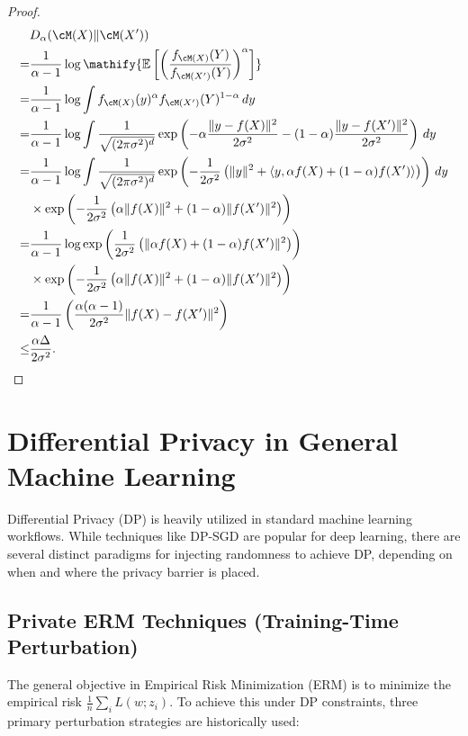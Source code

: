 \documentclass[11pt, a4paper]{article}
\newcommand{\E}[1]{\mathify{\mathbb{E}\left[#1\right]}}
\begin{document}
\begin{proof}
    \begin{align}
        &D_{\alpha} (\cM(X)\| \cM(X'))\\
        =& \frac{1}{\alpha-1} \log \E{\left(\frac{f_{\cM(X)}(Y)}{f_{\cM(X')}(Y)}\right)^\alpha}\\
        =& \frac{1}{\alpha-1} \log \int f_{\cM(X)}(y)^\alpha f_{\cM(X')}(Y)^{1-\alpha}\, dy\\
        =& \frac{1}{\alpha-1} \log \int \frac{1}{\sqrt{(2\pi \sigma^2)^d}} 
            \exp\left(-\alpha \frac{\|y-f(X)\|^2}{2\sigma^2} - (1-\alpha)\frac{\|y-f(X')\|^2}{2\sigma^2}\right)\, dy\\
        =& \frac{1}{\alpha-1} \log \int \frac{1}{\sqrt{(2\pi \sigma^2)^d}} 
            \exp\left(-\frac{1}{2\sigma^2} \left(\|y\|^2  + \langle y, \alpha f(X) + (1-\alpha) f(X')\rangle\right)\right)\, dy\nonumber\\
            &\times \exp\left(-\frac{1}{2\sigma^2}\left( \alpha \|f(X)\|^2 + (1-\alpha)\|f(X')\|^2 \right)\right)\\
        =& \frac{1}{\alpha-1} \log \exp\left(\frac{1}{2\sigma^2}\left( \|\alpha f(X) + (1-\alpha) f(X')\|^2 \right)\right)\nonumber\\
            &\times \exp\left(-\frac{1}{2\sigma^2}\left( \alpha \|f(X)\|^2 + (1-\alpha)\|f(X')\|^2 \right)\right)\\
        =& \frac{1}{\alpha-1}\left(\frac{\alpha(\alpha-1)}{2\sigma^2} \|f(X) - f(X')\|^2\right)\\
        \leq& \frac{\alpha \Delta}{2\sigma^2}.
    \end{align}
\end{proof}



\section{Differential Privacy in General Machine Learning}

Differential Privacy (DP) is heavily utilized in standard machine learning workflows. While techniques like DP-SGD are popular for deep learning, there are several distinct paradigms for injecting randomness to achieve DP, depending on when and where the privacy barrier is placed.

\subsection{Private ERM Techniques (Training-Time Perturbation)}
The general objective in Empirical Risk Minimization (ERM) is to minimize the empirical risk $\frac{1}{n}\sum_{i} L(w; z_i)$. To achieve this under DP constraints, three primary perturbation strategies are historically used:
\end{document}
